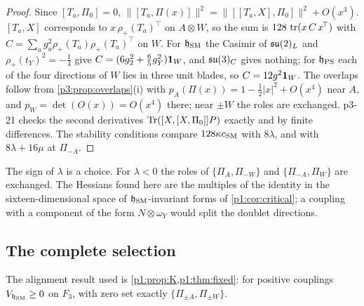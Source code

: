 \begin{proof}
Since $[T_a,\Pi_0]=0$, $\|[T_a,\Pi(x)]\|^2=\|[[T_a,X],\Pi_0]\|^2+O(x^3)$. $[T_a,X]$ corresponds to $x\,\rho_+(T_a)^{\!\top}$ on $A\otimes W$, so the sum is
$128\,\operatorname{tr}(x\,C\,x^{\!\top})$ with $C=\sum_ag_a^2\rho_+(T_a)\rho_+(T_a)^{\!\top}$ on $W$. For $\mathfrak h_{\rm SM}$ the Casimir of $\mathfrak{su}(2)_L$ and $\rho_+(t_Y)^2=-\tfrac14$ give
$C=(6g_2^2+\tfrac65g_Y^2)\mathbf 1_W$, and $\mathfrak{su}(3)_C$ gives nothing; for $\mathfrak h_{\rm PS}$ each of the four directions of $W$ lies in three unit blades, so $C=12g^2\mathbf 1_W$. The
overlaps follow from \cref{p3:prop:overlaps}(i) with $p_A(\Pi(x))=1-\tfrac12|x|^2+O(x^4)$ near $A$, and $p_W=\det(O(x))=O(x^4)$ there; near $\pm W$ the roles are exchanged.
p3-21 checks the second derivatives $\operatorname{Tr}([X,[X,\Pi_0]]P)$ exactly and by finite differences. The stability conditions compare $128\kappa c_{\rm SM}$ with $8\lambda$, and with
$8\lambda+16\mu$ at $\Pi_{-A}$.
\end{proof}

The sign of $\lambda$ is a choice. For $\lambda<0$ the roles of $\{\Pi_A,\Pi_{-W}\}$ and $\{\Pi_{-A},\Pi_W\}$ are exchanged. The Hessians found here are the multiples of
the identity in the sixteen-dimensional space of $\mathfrak h_{\rm SM}$-invariant forms of \cref{p1:cor:critical}; a coupling with a component of the form
$N\otimes\omega_Y$ would split the doublet directions.

\subsection{The complete selection}
\label{p3:sec:selection}

The alignment result used is \cref{p1:prop:K,p1:thm:fixed}: for positive couplings $V_{\mathfrak h_{\rm SM}}\ge0$ on $F_3$, with zero set exactly $\{\Pi_{\pm A},\Pi_{\pm W}\}$.


